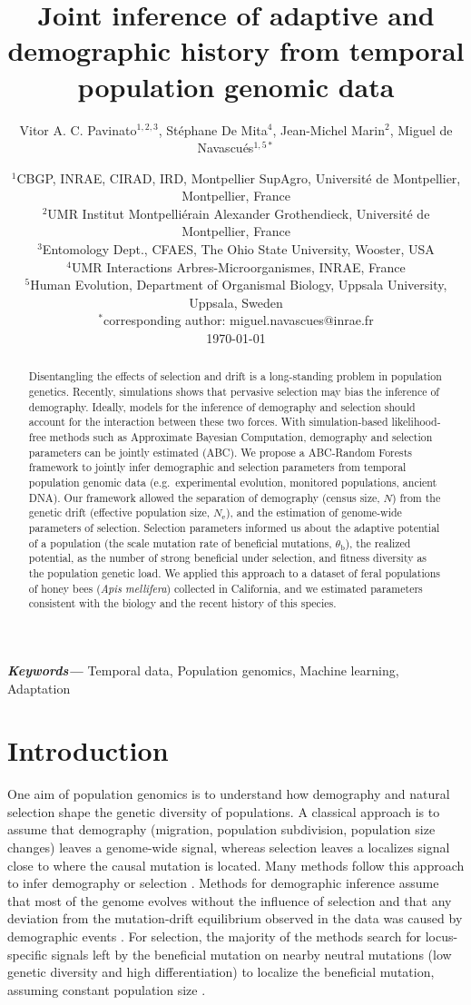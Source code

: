 \documentclass[a4paper, 12pt]{article}
\title{Joint inference of adaptive and demographic history from temporal population genomic data}
\author{\small
            Vitor A. C. Pavinato$^{1,2,3}$, Stéphane De Mita$^4$, Jean-Michel Marin$^2$, Miguel de Navascués$^{1,5*}$}
\date{{\footnotesize %
    $^1$CBGP, INRAE, CIRAD, IRD, Montpellier SupAgro, Université de Montpellier, Montpellier, France\\%
    $^2$UMR Institut Montpelliérain Alexander Grothendieck, Université de Montpellier, France \\%
    $^3$Entomology Dept., CFAES, The Ohio State University, Wooster, USA\\%
    $^4$UMR Interactions Arbres-Microorganismes, INRAE, France \\%
    $^5$Human Evolution, Department of Organismal Biology, Uppsala University, Uppsala, Sweden\\%
    $^*$corresponding author: miguel.navascues@inrae.fr\\[2ex]%
    }
    \footnotesize\today    
}
\providecommand{\keywords}[1]
{
  \small	
  \textbf{\textit{Keywords---}} #1
}
\begin{document}
\maketitle

\begin{abstract}
Disentangling the effects of selection and drift is a long-standing problem in population genetics. Recently, simulations shows that pervasive selection may bias the inference of demography. Ideally, models for the inference of demography and selection should account for the interaction between these two forces.
With simulation-based likelihood-free methods such as Approximate Bayesian Computation, demography and selection parameters can be jointly estimated (ABC). We propose a ABC-Random Forests framework to jointly infer demographic and selection parameters from temporal population genomic data (e.g.\ experimental evolution, monitored populations, ancient DNA). Our framework allowed the separation of demography (census size, $N$) from the genetic drift (effective population size, $N_{\mathrm{e}}$), and the estimation of genome-wide parameters of selection. Selection parameters informed us about the adaptive potential of a population (the scale mutation rate of beneficial mutations, $\theta_{\mathrm{b}}$), the realized potential, as the number of strong beneficial under selection, and fitness diversity as the population genetic load. We applied this approach to a dataset of feral populations of honey bees (\textit{Apis mellifera}) collected in California, and we estimated parameters consistent with the biology and the recent history of this species.
\end{abstract}\hspace{12pt}

\keywords{Temporal data, Population genomics, Machine learning, Adaptation}

\newpage

\section*{Introduction}

One aim of population genomics is to understand how demography and natural selection shape the genetic diversity of populations. A classical approach is to assume that demography (migration, population subdivision, population size changes) leaves a genome-wide signal, whereas selection leaves a localizes signal close to where the causal mutation is located. Many methods follow this approach to infer demography or selection \citep[reviewed by][]{Beichman:2018bx, Casillas:2017jv}. Methods for demographic inference assume that most of the genome evolves without the influence of selection and that any deviation from the mutation-drift equilibrium observed in the data was caused by demographic events \citep{Beichman:2018bx}. For selection, the majority of the methods search for locus-specific signals left by the beneficial mutation on nearby neutral mutations \citep{Tajima:1989un, Fay:2000dl, Kim:2004ih} (low genetic diversity and high differentiation) to localize the beneficial mutation, assuming constant population size \citep{Nielsen:2005kx, Pool:2010eh}.
\end{document}
